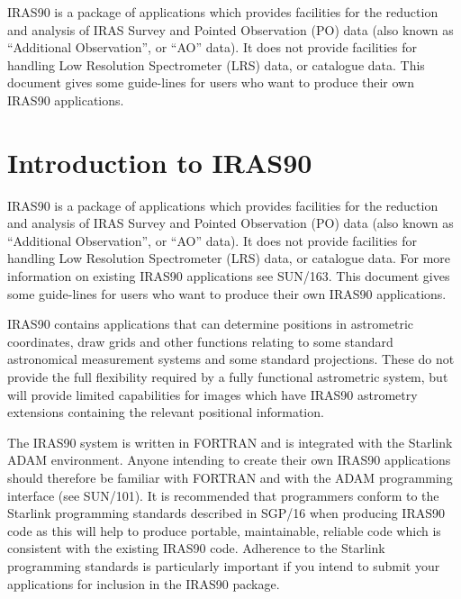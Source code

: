 \documentclass[twoside,11pt]{article}
\newcommand{\stardocinitials}  {SUN}
\newcommand{\stardocnumber}    {165.4}
\newcommand{\stardocabstract}  {
{\small IRAS90} is a package of applications which provides facilities
for the reduction and analysis of {\small IRAS} Survey and Pointed
Observation (PO) data (also known as ``Additional Observation'', or
``AO'' data). It does not provide facilities for handling Low
Resolution Spectrometer (LRS) data, or catalogue data.
This document gives some guide-lines for users who want to produce their own
{\small IRAS90} applications.
}
\newcommand{\stardocname}{\stardocinitials /\stardocnumber}
\newenvironment{latexonly}{}{}
\newcommand{\xref}[3]{#1}
\newcommand{\xlabel}[1]{}
\renewcommand{\thepage}{\roman{page}}
\begin{document}
\stardocabstract
\newpage
\begin{latexonly}
   \setlength{\parskip}{0mm}
   \tableofcontents
   \setlength{\parskip}{\medskipamount}
   \markright{\stardocname}
\end{latexonly}
\newpage
\renewcommand{\thepage}{\arabic{page}}
\setcounter{page}{1}

\section{Introduction to IRAS90\xlabel{introduction_to_iras90}}

{\small IRAS90} is a package of applications which provides facilities
for the reduction and analysis of {\small IRAS} Survey and Pointed
Observation (PO) data (also known as ``Additional Observation'', or
``AO'' data). It does not provide facilities for handling Low
Resolution Spectrometer (LRS) data, or catalogue data. For more
information on existing {\small IRAS90} applications see
\xref{SUN/163}{sun163}{}.  This
document gives some guide-lines for users who want to produce their own
{\small IRAS90} applications.

{\small IRAS90} contains applications that can determine positions in 
astrometric coordinates, draw grids and other functions relating to some 
standard astronomical measurement systems and some standard projections. These 
do not provide the full flexibility required by a fully functional astrometric
system, but will provide limited capabilities for images which have {\small 
IRAS90} astrometry extensions containing the relevant positional information.

The {\small IRAS90} system is written in {\small FORTRAN} and is
integrated with the Starlink {\small ADAM} environment. Anyone
intending to create their own {\small IRAS90} applications should
therefore be familiar with {\small FORTRAN} and with the {\small ADAM}
programming interface
(see \xref{SUN/101}{sun101}{}). It is recommended that programmers
conform to the Starlink programming standards described in
\xref{SGP/16}{sgp16}{} when
producing {\small IRAS90} code as this will help to produce portable,
maintainable, reliable code which is consistent with the existing
{\small IRAS90} code. Adherence to the Starlink programming standards
is particularly important if you intend to submit your applications for
inclusion in the {\small IRAS90} package. 
\end{document}
